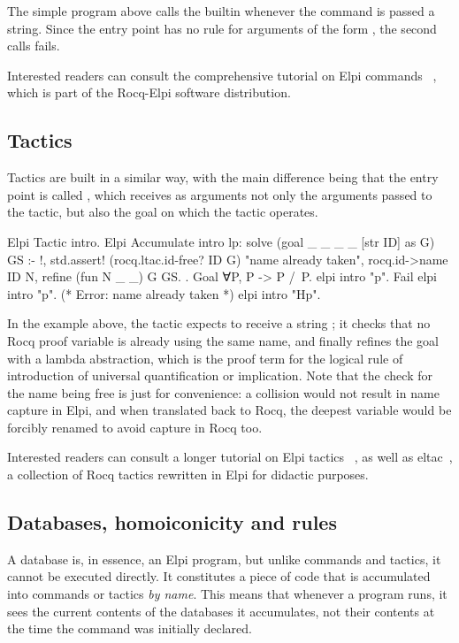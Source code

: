 \documentclass[a4paper, 11pt]{book}
\begin{document}
The simple program above calls the  builtin whenever the
command is passed a string. Since the entry point  has no rule for
arguments of the form , the second calls fails.

Interested readers can consult the comprehensive tutorial on Elpi commands
~\cite{tuto:commands}, which is part of the Rocq-Elpi software distribution.

\subsection{Tactics}


Tactics are built in a similar way, with the main difference being that the
entry point is called , which receives as arguments not only the
arguments passed to the tactic, but also the goal on which the tactic
operates.

\begin{rocqcode}
Elpi Tactic intro.
Elpi Accumulate intro lp:{{
  solve (goal _ _ _ _ [str ID] as G) GS :- !,
    std.assert! (rocq.ltac.id-free? ID G) "name already taken",
    rocq.id->name ID N,
    refine (fun N _ _) G GS.
}}.
Goal ∀P, P -> P /\ P.
elpi intro "p".
Fail elpi intro "p". (* Error: name already taken *)
elpi intro "Hp".
\end{rocqcode}


In the example above, the tactic expects to receive a string ; it
checks that no Rocq proof variable is already using the same name, and finally
refines the goal with a lambda abstraction, which is the proof term for the
logical rule of introduction of universal quantification or implication.
Note that the check for the name being free is just for convenience: a
collision would not result in name capture in Elpi, and when translated back
to Rocq, the deepest variable would be forcibly renamed to avoid capture in Rocq too.

Interested readers can consult a longer tutorial on Elpi tactics
~\cite{tuto:tactics}, as well as eltac~\cite{app:eltac}, a collection of Rocq
tactics rewritten in Elpi for didactic purposes.

\subsection{Databases, homoiconicity and rules}\label{sec:homo}


A database is, in essence, an Elpi program, but unlike commands and tactics,
it cannot be executed directly. It constitutes a piece of code that is
accumulated into commands or tactics \emph{by name}. This means that whenever
a program runs, it sees the current contents of the databases it accumulates,
not their contents at the time the command was initially declared.
\end{document}
